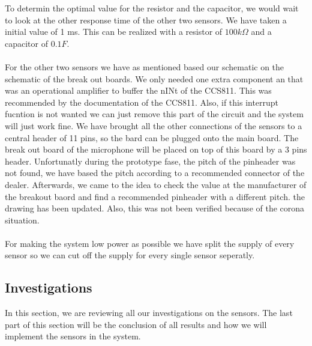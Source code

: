 \documentclass[11pt,a4paper]{article}
\begin{document}
To determin the optimal value for the resistor and the capacitor, we would wait to look at the other response time of the other two sensors. We have taken a initial value of 1 ms. This can be realized with a resistor of $ 100k\Omega$ and a capacitor of $0.1 F$.
\\ \\
For the other two sensors we have as mentioned based our schematic on the schematic of the break out boards. We only needed one extra component an that was an operational amplifier to buffer the nINt of the CCS811. This was recommended by the documentation of the CCS811. Also, if this interrupt fucntion is not wanted we can just remove this part of the circuit and the system will just work fine. We have brought all the other connections of the sensors to a central header of 11 pins, so the bard can be plugged onto the main board. The break out board of the microphone will be placed on top of this board by a 3 pins header. Unfortunatly during the prototype fase, the pitch of the pinheader was not found, we have based the pitch according to a recommended connector of the dealer. Afterwards, we came to the idea to check the value at the manufacturer of the breakout baord and find a recommended pinheader with a different pitch. the drawing has been updated. Also, this was not been verified because of the corona situation.
\\ \\
For making the system low power as possible we have split the supply of every sensor so we can cut off the supply for every single sensor seperatly.

\subsection{Investigations}
In this section, we are reviewing all our investigations on the sensors. The last part of this section will be the conclusion of all results and how we will implement the sensors in the system.
\end{document}
